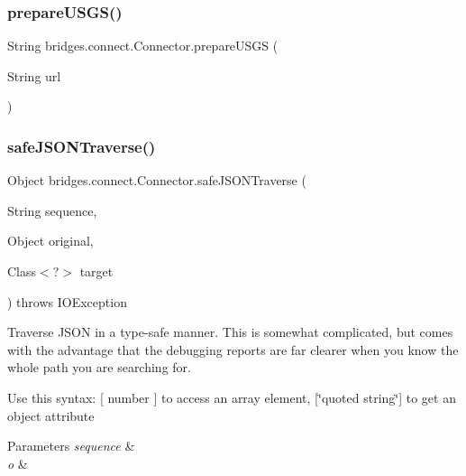 \subsubsection{\texorpdfstring{prepare\+U\+S\+G\+S()}{prepareUSGS()}}
{\footnotesize\ttfamily String bridges.\+connect.\+Connector.\+prepare\+U\+S\+GS (\begin{DoxyParamCaption}\item[{String}]{url }\end{DoxyParamCaption})}

\hypertarget{classbridges_1_1connect_1_1_connector_ab7d1d242fbf9acade316650e54a3d020}{}\label{classbridges_1_1connect_1_1_connector_ab7d1d242fbf9acade316650e54a3d020} 
\subsubsection{\texorpdfstring{safe\+J\+S\+O\+N\+Traverse()}{safeJSONTraverse()}}
{\footnotesize\ttfamily Object bridges.\+connect.\+Connector.\+safe\+J\+S\+O\+N\+Traverse (\begin{DoxyParamCaption}\item[{String}]{sequence,  }\item[{Object}]{original,  }\item[{Class$<$?$>$}]{target }\end{DoxyParamCaption}) throws I\+O\+Exception}

Traverse J\+S\+ON in a type-\/safe manner. This is somewhat complicated, but comes with the advantage that the debugging reports are far clearer when you know the whole path you are searching for.

Use this syntax\+: \mbox{[} number \mbox{]} to access an array element, \mbox{[}\char`\"{}quoted string\char`\"{}\mbox{]} to get an object attribute


\begin{DoxyParams}{Parameters}
{\em sequence} & \\
\hline
{\em o} & \\
\hline
\end{DoxyParams}
\hypertarget{classbridges_1_1connect_1_1_connector_a71f449c91e529f79730df27e01fdf674}{}\label{classbridges_1_1connect_1_1_connector_a71f449c91e529f79730df27e01fdf674} 
